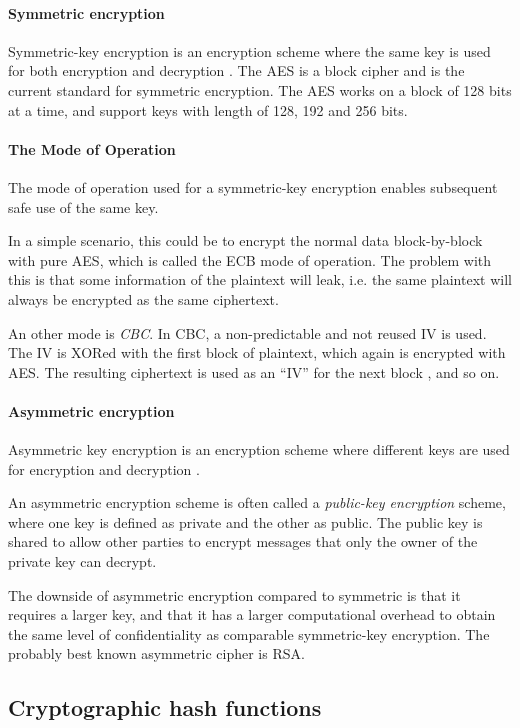 \documentclass[pdftex,english,10pt,b5paper,twoside]{book}
\begin{document}
\paragraph{Symmetric encryption} Symmetric-key encryption is an encryption scheme
where the same key is used for both encryption and decryption \cite[p.
32]{stallings}. The \ac{AES} is a block cipher and is the current standard for
symmetric encryption. The \ac{AES} works on a block of 128 bits at a time,
and support keys with length of 128, 192 and 256 bits.

\paragraph{The Mode of Operation} The mode of operation used for a
symmetric-key encryption enables subsequent safe use of the same key.

In a simple scenario, this could be to encrypt the normal data block-by-block
with pure \ac{AES}, which is called the \ac{ECB} mode of operation. The problem
with this is that some information of the plaintext will leak, i.e. the same
plaintext will always be encrypted as the same ciphertext.

An other mode is \emph{\ac{CBC}}. In \ac{CBC}, a non-predictable and not reused
\ac{IV} is used. The \ac{IV} is XORed with the first block of plaintext, which
again is encrypted with \ac{AES}. The resulting ciphertext is used as an
``\ac{IV}'' for the next block \cite[p. 183]{stallings}, and so on.

\paragraph{Asymmetric encryption} Asymmetric key encryption is an encryption scheme
where different keys are used for encryption and decryption 
\cite[p. 259]{stallings}. 

An asymmetric encryption scheme is often called a \emph{public-key
encryption} scheme, where one key is defined as private and the other as public.
The public key is shared to allow other parties to encrypt messages that only the
owner of the private key can decrypt.

The downside of asymmetric encryption compared to symmetric is that it requires
a larger key, and that it has a larger computational overhead to obtain the
same level of confidentiality as comparable symmetric-key encryption. The
probably best known asymmetric cipher is \ac{RSA}.

\subsection{Cryptographic hash functions}
\end{document}
